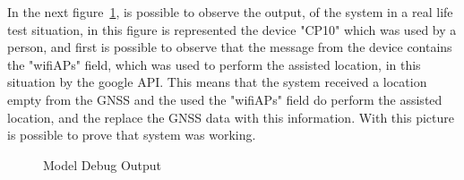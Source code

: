 In the next figure~\ref{fig:node_red_debug}, is possible to observe the output, of the system in a real life test situation, in this figure is represented the device "CP10" which was used by a person, and first is possible to observe that the message from the device contains the "wifiAPs" field, which was used to perform the assisted location, in this situation by the google API. This means that the system received a location empty from the GNSS and the used the "wifiAPs" field do perform the assisted location, and the replace the GNSS data with this information. With this picture is possible to prove that system was working.
\begin{figure}[htbp]
  \centering
  \caption{Model Debug Output}
  \label{fig:node_red_debug}
\end{figure}



